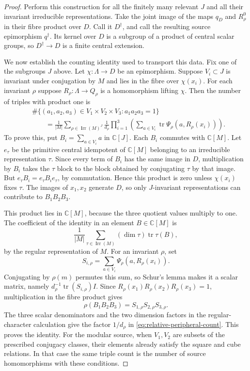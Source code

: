 \begin{proof}
Perform this construction for all the finitely many relevant $J$ and
all their invariant irreducible representations. Take the joint image
of the maps $q_D$ and $R_\rho^0$ in their fibre product over $D$.
Call it $D^\dagger$, and call the resulting source epimorphism
$q^\dagger$. Its kernel over $D$ is a subgroup of a product of central
scalar groups, so $D^\dagger\to D$ is a finite central extension.

We now establish the counting identity used to transport this data.
Fix one of the subgroups $J$ above. Let $\chi:\Lambda\to D$ be
an epimorphism. Suppose $V_i\subset J$ is invariant under conjugation
by $M$ and lies in the fibre over $\chi(x_i)$. For each invariant
$\rho$ suppose $R_\rho:\Lambda\to Q_\rho$ is a homomorphism lifting
$\chi$. Then the number of triples with product one is
\begin{equation}
 \begin{split}
 &\#\{(a_1,a_2,a_3)\in V_1\times V_2\times V_3:
                   a_1a_2a_3=1\}\\
 &\qquad=\frac1{|M|}
  \sum_{\rho\in\operatorname{Irr}(M)^J}\frac1{d_\rho}
  \prod_{i=1}^3
    \left(\sum_{a\in V_i}
       \operatorname{tr}\Psi_\rho(a,R_\rho(x_i))\right).
 \end{split}
 \label{eq:relative-peripheral-count}
\end{equation}
To prove this, put $B_i=\sum_{a\in V_i}a$ in $\mathbb C[J]$.
Each $B_i$ commutes with $\mathbb C[M]$. Let $e_\tau$ be the
primitive central idempotent of $\mathbb C[M]$ belonging to an
irreducible representation $\tau$. Since every term of $B_i$ has
the same image in $D$, multiplication by $B_i$ takes the $\tau$
block to the block obtained by conjugating $\tau$ by that image.
But $e_\tau B_i=e_\tau B_ie_\tau$, by commutation. Hence this
product is zero unless $\chi(x_i)$ fixes $\tau$. The images of
$x_1,x_2$ generate $D$, so only $J$-invariant representations can
contribute to $B_1B_2B_3$.

This product lies in $\mathbb C[M]$, because the three quotient
values multiply to one. The coefficient of the identity in an
element $B\in\mathbb C[M]$ is
\[
 \frac1{|M|}\sum_{\tau\in\operatorname{Irr}(M)}
                  (\dim\tau)\operatorname{tr}\tau(B),
\]
by the regular representation of $M$. For an invariant $\rho$, set
\[
 S_{i,\rho}=\sum_{a\in V_i}\Psi_\rho(a,R_\rho(x_i)).
\]
Conjugating by $\rho(m)$ permutes this sum, so Schur's lemma makes
it a scalar matrix, namely
$d_\rho^{-1}\operatorname{tr}(S_{i,\rho})I$.
Since $R_\rho(x_1)R_\rho(x_2)R_\rho(x_3)=1$, multiplication in
the fibre product gives
\[
 \rho(B_1B_2B_3)=S_{1,\rho}S_{2,\rho}S_{3,\rho}.
\]
The three scalar denominators and the two dimension factors in the
regular-character calculation give the factor $1/d_\rho$ in
\eqref{eq:relative-peripheral-count}. This proves the identity.
For the modular source, when $V_1,V_2$ are subsets of the prescribed
conjugacy classes, their elements already satisfy the square and cube
relations. In that case the same triple count is the number of source
homomorphisms with these conditions.


\end{proof}
